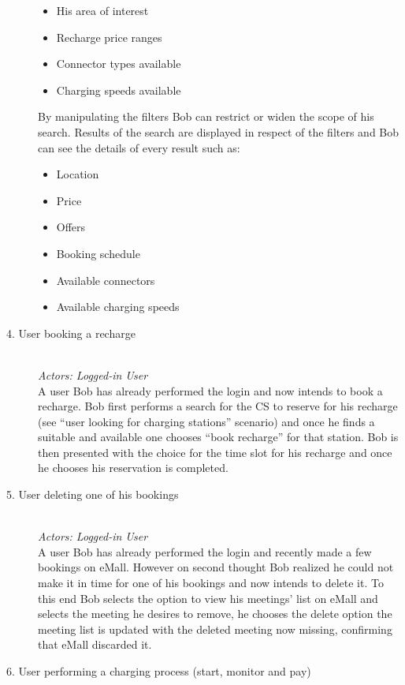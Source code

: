 \documentclass[11pt]{article}
\begin{document}
\begin{description}
\begin{itemize}
            \item His area of interest
            \item Recharge price ranges
            \item Connector types available
            \item Charging speeds available
        \end{itemize}
        By manipulating the filters Bob can restrict or widen the scope of his search. Results of the search are displayed in respect of the filters and Bob can see the details of every result such as:
        \begin{itemize}
            \item Location
            \item Price
            \item Offers
            \item Booking schedule
            \item Available connectors
            \item Available charging speeds
        \end{itemize}
    \item [4. User booking a recharge] \hfill \\
        \textit{Actors: Logged-in User} \\
        A user Bob has already performed the login and now intends to book a recharge. Bob first performs a search for the CS to reserve for his recharge (see “user looking for charging stations” scenario) and once he finds a suitable and available one chooses “book recharge” for that station. Bob is then presented with the choice for the time slot for his recharge and once he chooses his reservation is completed.
    \item [5. User deleting one of his bookings] \hfill \\
        \textit{Actors: Logged-in User} \\
        A user Bob has already performed the login and recently made a few bookings on eMall. However on second thought Bob realized he could not make it in time for one of his bookings and now intends to delete it. To this end Bob selects the option to view his meetings' list on eMall and selects the meeting he desires to remove, he chooses the delete option the meeting list is updated with the deleted meeting now missing, confirming that eMall discarded it.
    \item [6. User performing a charging process (start, monitor and pay)] \hfill \\

\end{description}
\end{document}
